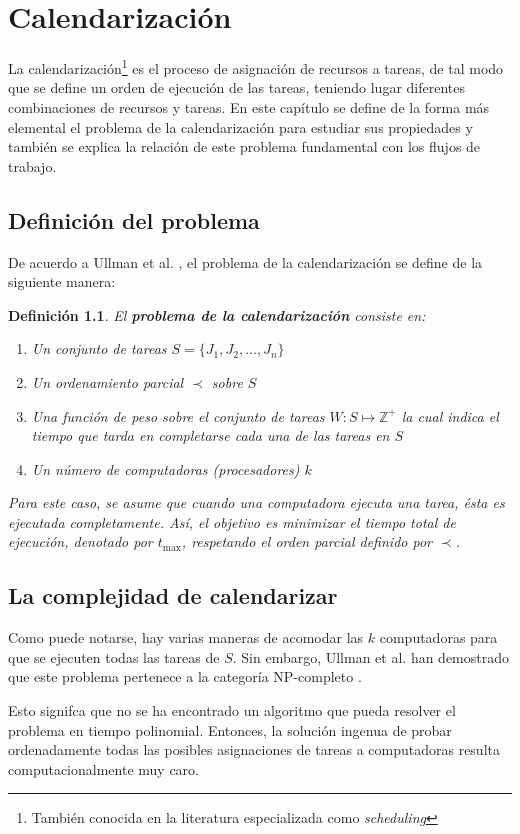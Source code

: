 \documentclass[letterpaper, 12pt]{report}
\newtheorem{defn}{Definición}
\begin{document}
\chapter{Calendarización}
La calendarización\footnote{También conocida en la literatura especializada como \emph{scheduling}} es el proceso de asignación de recursos a tareas, de tal modo que se define un orden de ejecución de las tareas, teniendo lugar diferentes combinaciones de recursos y tareas. En este capítulo se define de la forma más elemental el problema de la calendarización para estudiar sus propiedades y también se explica la relación de este problema fundamental con los flujos de trabajo.

\section{Definición del problema}
De acuerdo a  Ullman et al. \cite{ullman1975np}, el problema de la calendarización se define de la siguiente manera: 

\begin{defn}
El \textbf{problema de la calendarización} consiste en:
\begin{enumerate}
\item Un conjunto de tareas $S = \{ J_1, J_2, \dots, J_n \}$
\item Un ordenamiento parcial $\prec$ sobre $S$
\item Una función de peso sobre el conjunto de tareas $W: S \mapsto \mathbb{Z}^{+} $ la cual indica el tiempo que tarda en completarse cada una de las tareas en $S$
\item Un número de computadoras (procesadores) $k$
\end{enumerate}
Para este caso, se asume que cuando una computadora ejecuta una tarea, ésta es ejecutada completamente. Así, el objetivo es \emph{minimizar} el tiempo total de ejecución, denotado por $t_\text{max}$, respetando el orden parcial definido por $\prec$.
\end{defn}


\section{La complejidad de calendarizar}
Como puede notarse, hay varias maneras de acomodar las $k$ computadoras para que se ejecuten todas las tareas de $S$. Sin embargo, Ullman et al. han demostrado que este problema pertenece a la categoría NP-completo \cite{ullman1975np}.

Esto signifca que no se ha encontrado un algoritmo que pueda resolver el problema en tiempo polinomial. Entonces, la solución ingenua de probar ordenadamente todas las posibles asignaciones de tareas a computadoras resulta computacionalmente muy caro.
\end{document}
